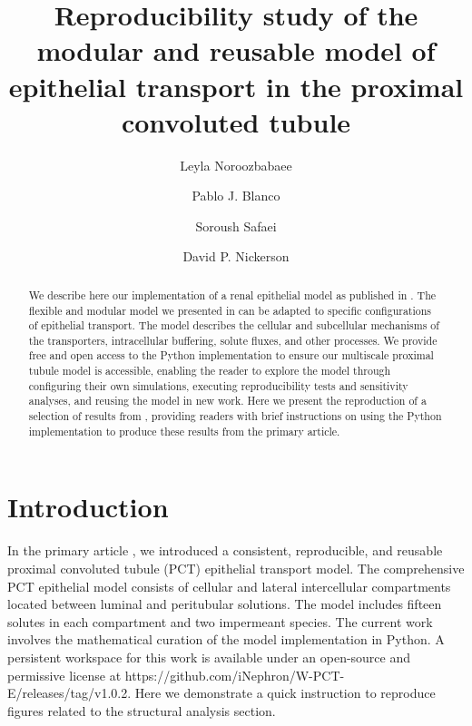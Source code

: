 \documentclass[fleqn,10pt]{physiome}
\title{Reproducibility study of the modular and reusable model of epithelial transport in the proximal convoluted tubule}
\author[1][l.noroozbabaee@auckland.ac.nz]{Leyla Noroozbabaee}
\author[2]{Pablo J. Blanco}
\author[1]{Soroush Safaei}
\author[1]{David P. Nickerson}
\affil[1]{Auckland Bioengineering Institute, University of Auckland, New Zealand}
\affil[2]{National Laboratory for Scientific Computing, Petrópolis, Brazil}
\begin{document}
\maketitle
\begin{abstract}
We describe here our implementation of a renal epithelial model as published in \cite{noroozbabaee2022modular}. The flexible and modular model we presented in \cite{noroozbabaee2022modular} can be adapted to specific configurations of epithelial transport. The model describes the cellular and subcellular mechanisms of the transporters, intracellular buffering, solute fluxes, and other processes. We provide free and open access to the Python implementation to ensure our multiscale proximal tubule model is accessible, enabling the reader to explore the model through configuring their own simulations, executing reproducibility tests and sensitivity analyses, and reusing the model in new work.
Here we present the reproduction of a selection of results from \cite{noroozbabaee2022modular}, providing readers with brief instructions on using the Python implementation to produce these results from the primary article.
\end{abstract}


\section{Introduction}
 In the primary article \citep{noroozbabaee2022modular}, we introduced a consistent, reproducible, and reusable proximal convoluted tubule (PCT) epithelial transport model. The comprehensive PCT epithelial model consists of cellular and lateral intercellular compartments located between luminal and peritubular solutions. The model includes fifteen solutes in each compartment and two impermeant species. The current work involves the mathematical curation of the model implementation in Python. A persistent workspace for this work is available under an open-source and permissive license at https://github.com/iNephron/W-PCT-E/releases/tag/v1.0.2.  
Here we demonstrate a quick instruction to reproduce figures related to the structural analysis section.
\end{document}
